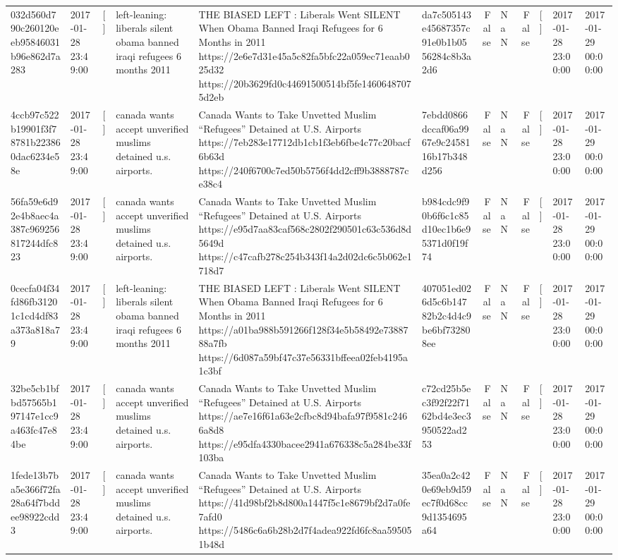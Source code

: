 \begin{tabular}{llllllrlrlll}
032d560d790c260120eeb95846031b96e862d7a283 & 2017-01-28 23:49:00 & [] & left-leaning: liberals silent obama banned iraqi refugees 6 months 2011 & THE BIASED LEFT : Liberals Went SILENT When Obama Banned Iraqi Refugees for 6 Months in 2011 https://2e6e7d31e45a5c82fa5bfc22a059ec71eaab025d32 https://20b3629fd0c44691500514bf5fe14606487075d2eb & da7c505143e45687357c91e0b1b0556284c8b3a2d6 & False & NaN & False & [] & 2017-01-28 23:00:00 & 2017-01-29 00:00:00 \\
4ccb97c522b19901f3f78781b223860dac6234e58e & 2017-01-28 23:49:00 & [] & canada wants accept unverified muslims detained u.s. airports. & Canada Wants to Take Unvetted Muslim “Refugees” Detained at U.S. Airports https://7eb283e17712db1cb1f3eb6fbe4c77c20bacf6b63d https://240f6700c7ed50b5756f4dd2cff9b3888787ce38c4 & 7ebdd0866dccaf06a9967e9c2458116b17b348d256 & False & NaN & False & [] & 2017-01-28 23:00:00 & 2017-01-29 00:00:00 \\
56fa59e6d92e4b8aec4a387c969256817244dfc823 & 2017-01-28 23:49:00 & [] & canada wants accept unverified muslims detained u.s. airports. & Canada Wants to Take Unvetted Muslim “Refugees” Detained at U.S. Airports https://e95d7aa83caf568c2802f290501c63c536d8d5649d https://c47cafb278c254b343f14a2d02dc6c5b062e1718d7 & b984cdc9f90b6f6c1c85d10ec1b6e95371d0f19f74 & False & NaN & False & [] & 2017-01-28 23:00:00 & 2017-01-29 00:00:00 \\
0cecfa04f34fd86fb31201c1cd4df83a373a818a79 & 2017-01-28 23:49:00 & [] & left-leaning: liberals silent obama banned iraqi refugees 6 months 2011 & THE BIASED LEFT : Liberals Went SILENT When Obama Banned Iraqi Refugees for 6 Months in 2011 https://a01ba988b591266f128f34e5b58492e7388788a7fb https://6d087a59bf47c37e56331bffeea02feb4195a1c3bf & 407051ed026d5c6b14782b2c4d4c9be6bf732808ee & False & NaN & False & [] & 2017-01-28 23:00:00 & 2017-01-29 00:00:00 \\
32be5cb1bfbd57565b197147e1cc9a463fc47e84be & 2017-01-28 23:49:00 & [] & canada wants accept unverified muslims detained u.s. airports. & Canada Wants to Take Unvetted Muslim “Refugees” Detained at U.S. Airports https://ae7e16f61a63e2cfbc8d94bafa97f9581c2466a8d8 https://e95dfa4330bacee2941a676338c5a284be33f103ba & c72cd25b5ec3f92f22f7162bd4e3ec3950522ad253 & False & NaN & False & [] & 2017-01-28 23:00:00 & 2017-01-29 00:00:00 \\
1fede13b7ba5e366f72fa28a64f7bddee98922cdd3 & 2017-01-28 23:49:00 & [] & canada wants accept unverified muslims detained u.s. airports. & Canada Wants to Take Unvetted Muslim “Refugees” Detained at U.S. Airports https://41d98bf2b8d800a1447f5c1e8679bf2d7a0fe7afd0 https://5486c6a6b28b2d7f4adea922fd6fc8aa595051b48d & 35ea0a2c420e69eb9d59ec7f0d68cc9d1354695a64 & False & NaN & False & [] & 2017-01-28 23:00:00 & 2017-01-29 00:00:00 \\

\end{tabular}
